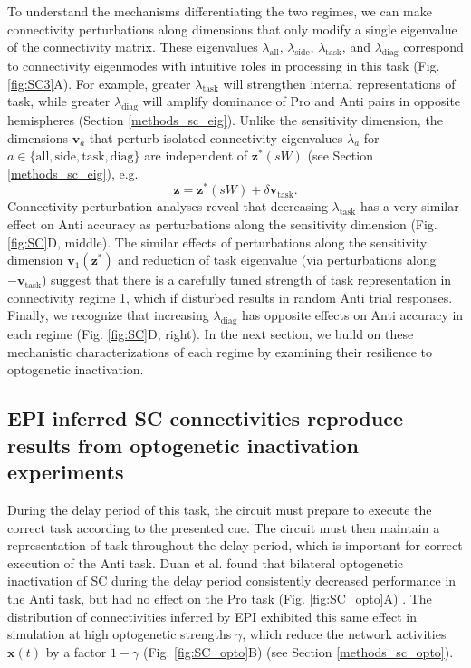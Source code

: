 \documentclass[11pt]{article}
\begin{document}
To understand the mechanisms differentiating the two regimes, we can make connectivity perturbations along dimensions that only modify a single eigenvalue of the connectivity matrix.
These eigenvalues $\lambda_{\text{all}}$, $\lambda_{\text{side}}$, $\lambda_{\text{task}}$, and $\lambda_{\text{diag}}$ correspond to connectivity eigenmodes with intuitive roles in processing in this task (Fig. \ref{fig:SC3}A).
For example, greater $\lambda_{\text{task}}$ will strengthen internal representations of task, while greater $\lambda_{\text{diag}}$ will amplify dominance of Pro and Anti pairs in opposite hemispheres (Section \ref{methods_sc_eig}).
Unlike the sensitivity dimension, the dimensions $\mathbf{v}_a$ that perturb isolated connectivity eigenvalues $\lambda_a$ for $a \in \{\text{all}, \text{side}, \text{task}, \text{diag}\}$ are independent of $\mathbf{z}^*(sW)$ (see Section \ref{methods_sc_eig}), e.g.
\begin{equation}
\mathbf{z} = \mathbf{z}^*(sW) + \delta \mathbf{v}_{\text{task}}.
\end{equation}
Connectivity perturbation analyses reveal that decreasing $\lambda_{\text{task}}$ has a very similar effect on Anti accuracy as perturbations along the sensitivity dimension (Fig. \ref{fig:SC}D, middle).
The similar effects of perturbations along the sensitivity dimension $\mathbf{v}_1(\mathbf{z}^*)$ and reduction of task eigenvalue (via perturbations along $-\mathbf{v}_{\text{task}}$) suggest that there is a carefully tuned strength of task representation in connectivity regime 1, which if disturbed results in random Anti trial responses.
Finally, we recognize that increasing $\lambda_{\text{diag}}$ has opposite effects on Anti accuracy in each regime (Fig. \ref{fig:SC}D, right).
In the next section, we build on these mechanistic characterizations of each regime by examining their resilience to optogenetic inactivation.

\subsection{EPI inferred SC connectivities reproduce results from optogenetic inactivation experiments} \label{results_SC_opt}
During the delay period of this task, the circuit must prepare to execute the correct task according to the presented cue.
The circuit must then maintain a representation of task throughout the delay period, which is important for correct execution of the Anti task.
Duan et al. found that bilateral optogenetic inactivation of SC during the delay period consistently decreased performance in the Anti task, but had no effect on the Pro task (Fig. \ref{fig:SC_opto}A) \cite{duan2019collicular}.
The distribution of connectivities inferred by EPI exhibited this same effect in simulation at high optogenetic strengths $\gamma$, which reduce the network activities $\mathbf{x}(t)$ by a factor $1 - \gamma$ (Fig. \ref{fig:SC_opto}B) (see Section \ref{methods_sc_opto}).
\end{document}
